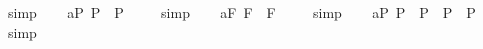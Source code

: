 \begin{isabellebody}
\isamarkupfalse%
\ simp\ \isamarkupfalse%
%
\endisatagproof
{\isafoldproof}%
%
\isadelimproof
%
\endisadelimproof
\isanewline
\ \isamarkupfalse%
\ a{}{}{\isacharunderscore}{}{\isacharunderscore}P{\isacharcolon}\ {\isachardoublequoteopen}{\isacharbrackleft}\isactrlbold {\isasymA}{\isacharparenleft}{\isasymphi}\isactrlsup P{\isacharparenright}\ \isactrlbold {\isasymequiv}\ \isactrlbold {\isasymA}{\isacharparenleft}\isactrlbold {\isasymA}{\isacharparenleft}{\isasymphi}\isactrlsup P{\isacharparenright}{\isacharparenright}{\isacharbrackright}\ {\isacharequal}\ {\isasymtop}{\isachardoublequoteclose}%
\isadelimproof
\ %
\endisadelimproof
%
\isatagproof
{}\isamarkupfalse%
\ simp\ \isamarkupfalse%
%
\endisatagproof
{\isafoldproof}%
%
\isadelimproof
%
\endisadelimproof
\isanewline
\ \isamarkupfalse%
\ a{}{}{\isacharunderscore}{}{\isacharunderscore}F{\isacharcolon}\ {\isachardoublequoteopen}{\isacharbrackleft}\isactrlbold {\isasymA}{\isacharparenleft}{\isasymphi}\isactrlsup F{\isacharparenright}\ \isactrlbold {\isasymequiv}\ \isactrlbold {\isasymA}{\isacharparenleft}\isactrlbold {\isasymA}{\isacharparenleft}{\isasymphi}\isactrlsup F{\isacharparenright}{\isacharparenright}{\isacharbrackright}\ {\isacharequal}\ {\isasymtop}{\isachardoublequoteclose}%
\isadelimproof
\ %
\endisadelimproof
%
\isatagproof
{}\isamarkupfalse%
\ simp\ \isamarkupfalse%
%
\endisatagproof
{\isafoldproof}%
%
\isadelimproof
%
\endisadelimproof
%
\isamarkuptrue%
\ \isamarkupfalse%
\ a{}{}{\isacharunderscore}{}{\isacharunderscore}P{\isacharcolon}\ {\isachardoublequoteopen}{\isacharbrackleft}{\isacharparenleft}\isactrlbold {\isasymbox}{\isacharparenleft}{\isasymphi}\isactrlsup P\ \isactrlbold {\isasymrightarrow}\ {\isasymphi}\isactrlsup P{\isacharparenright}{\isacharparenright}\ \isactrlbold {\isasymrightarrow}\ {\isacharparenleft}\isactrlbold {\isasymbox}{\isasymphi}\isactrlsup P\ \isactrlbold {\isasymrightarrow}\ \isactrlbold {\isasymbox}{\isasymphi}\isactrlsup P{\isacharparenright}{\isacharbrackright}\ {\isacharequal}\ {\isasymtop}{\isachardoublequoteclose}%
\isadelimproof
\ %
\endisadelimproof
%
\isatagproof
{}\isamarkupfalse%
\ simp\ \isamarkupfalse%
%
\endisatagproof
{\isafoldproof}%
%
\isadelimproof
%
\endisadelimproof
\ \ \ \ \ \isanewline
\ \isamarkupfalse%

\end{isabellebody}
